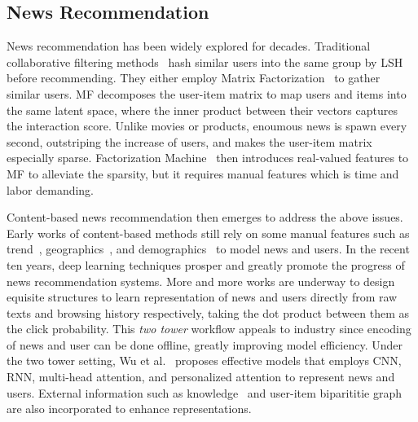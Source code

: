 \documentclass[sigconf,anonymous]{acmart}
\begin{document}
\subsection{News Recommendation}
News recommendation has been widely explored for decades. Traditional collaborative filtering methods~\cite{das_CF, li_SCENE} hash similar users into the same group by LSH before recommending. They either employ Matrix Factorization~\cite{koren_MF} to gather similar users. MF decomposes the user-item matrix to map users and items into the same latent space, where the inner product between their vectors captures the interaction score. Unlike movies or products, enoumous news is spawn every second, outstriping the increase of users, and makes the user-item matrix especially sparse. Factorization Machine~\cite{rendle_FM} then introduces real-valued features to MF to alleviate the sparsity, but it requires manual features which is time and labor demanding.

Content-based news recommendation then emerges to address the above issues. Early works of content-based methods still rely on some manual features such as trend~\cite{liu_bayesian_news_trend}, geographics~\cite{li_contextual_bandit}, and demographics~\cite{cheng_Wide&Deep} to model news and users. In the recent ten years, deep learning techniques prosper and greatly promote the progress of news recommendation systems. More and more works are underway to design equisite structures to learn representation of news and users directly from raw texts and browsing history respectively, taking the dot product between them as the click probability. This \emph{two tower} workflow appeals to industry since encoding of news and user can be done offline, greatly improving model efficiency. Under the two tower setting, Wu et al.~\cite{wu_GNN,wu_heterogeneous,wu_LSTUR,wu_NAML,wu_NPA,wu_NRMS,wu_topic-aware} proposes effective models that employs CNN, RNN, multi-head attention, and personalized attention to represent news and users. External information such as knowledge~\cite{wang_DKN} and user-item biparititie graph~\cite{wu_GNN,hu_GNN_disentanglement} are also incorporated to enhance representations.
\end{document}
